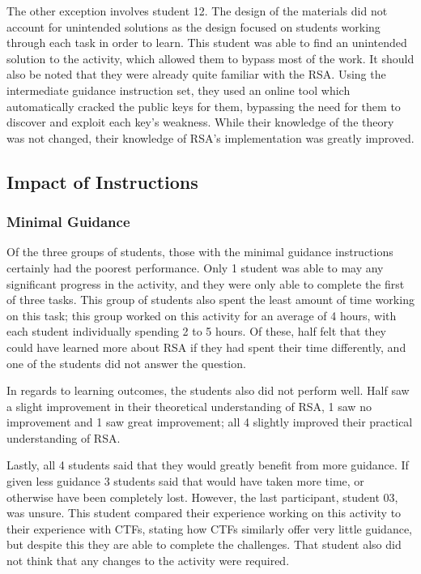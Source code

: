         The other exception involves student 12. The design of the materials did not account for unintended solutions as the design focused on students working through each task in order to learn. This student was able to find an unintended solution to the activity, which allowed them to bypass most of the work. It should also be noted that they were already quite familiar with the RSA. Using the intermediate guidance instruction set, they used an online tool which automatically cracked the public keys for them, bypassing the need for them to discover and exploit each key's weakness. While their knowledge of the theory was not changed, their knowledge of RSA's implementation was greatly improved. 

    \subsection{Impact of Instructions}
        \subsubsection*{Minimal Guidance}
            Of the three groups of students, those with the minimal guidance instructions certainly had the poorest performance. 
            Only 1 student was able to may any significant progress in the activity, and they were only able to complete the first of three tasks. 
            This group of students also spent the least amount of time working on this task; 
            this group worked on this activity for an average of 4 hours, with each student individually spending 2 to 5 hours. 
            Of these, half felt that they could have learned more about RSA if they had spent their time differently, and one of the students did not answer the question. 

            In regards to learning outcomes, the students also did not perform well. 
            Half saw a slight improvement in their theoretical understanding of RSA, 1 saw no improvement and 1 saw great improvement; 
            all 4 slightly improved their practical understanding of RSA. 

            Lastly, all 4 students said that they would greatly benefit from more guidance. 
            If given less guidance 3 students said that would have taken more time, or otherwise have been completely lost. 
            However, the last participant, student 03, was unsure. 
            This student compared their experience working on this activity to their experience with CTFs, stating how CTFs similarly offer very little guidance, but despite this they are able to complete the challenges. 
            That student also did not think that any changes to the activity were required. 
            
